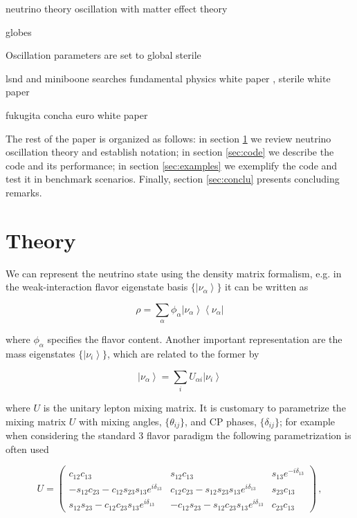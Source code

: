 \documentclass[3p,12pt,authoryear]{elsarticle}
\newcommand{\bra}[1]{\ensuremath{\left\langle#1\right|}}
\newcommand{\ket}[1]{\ensuremath{\left|#1\right\rangle}}
\begin{document}
neutrino theory \citep{Akhmedov:1999uz,Balantekin:2013kc}
oscillation with matter effect theory \citep{Blennow:2013hi}

globes \citep{Huber:2007ji}

Oscillation parameters are set to 
global sterile \citep{kopp2013sterile}

lsnd and miniboone searches \citep{Conrad:2013oq}
fundamental physics white paper \citep{Hewett:2012et}, sterile white paper \citep{Abazajian:2012rf}

fukugita \citep{fukugita2003physics}
concha \citep{Gonzalez-Garcia:2002qy}
euro white paper \citep{Agarwalla:2012mz}

The rest of the paper is organized as follows: in section \ref{sec:theory} we review neutrino oscillation theory and establish notation; in section \ref{sec:code} we describe the code and its performance; in section \ref{sec:examples} we exemplify the code and test it in benchmark scenarios. Finally, section \ref{sec:conclu} presents concluding remarks.

\section{Theory}
\label{sec:theory} 
\let\thefootnote\relax{} 

We can represent the neutrino state using the density matrix formalism, e.g. in the weak-interaction flavor eigenstate basis $\{\ket{\nu_\alpha}\}$  it can be written as

\begin{equation}
\rho = \sum_\alpha \phi_\alpha \ket{\nu_\alpha}\bra{\nu_\alpha} 
\label{eq:state}
\end{equation}

where $\phi_\alpha$ specifies the flavor content. Another important representation are the mass eigenstates $\{ \ket{\nu_i}  \}$, which are related to the former by

\begin{equation}
\ket{\nu_\alpha} = \sum_i U_{\alpha i} \ket{\nu_i} 
\label{eq:changebasis}
\end{equation}

where $U$ is the unitary lepton mixing matrix. It is customary to parametrize the mixing matrix $U$ with mixing angles, $\{\theta_{ij}\}$, and CP phases, $\{ \delta_{ij} \}$; for example when considering the standard 3 flavor paradigm the following parametrization is often used

\begin{equation}
U
=
\begin{pmatrix}
c_{12} c_{13} & s_{12} c_{13} & s_{13} e^{-i\delta_{13}} \\ 
- s_{12} c_{23} - c_{12} s_{23} s_{13} e^{i\delta_{13}} & c_{12} c_{23} - s_{12} s_{23} s_{13} e^{i\delta_{13}} & s_{23} c_{13} \\
s_{12}s_{23} -c_{12}c_{23}s_{13}e^{i\delta_{13}} & - c_{12} s_{23} - s_{12} c_{23} s_{13} e^{i\delta_{13}} & c_{23} c_{13}
\end{pmatrix}
\,,
\label{eq:U}
\end{equation}
\end{document}
